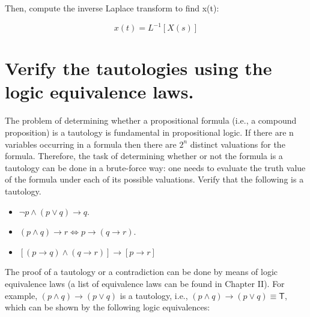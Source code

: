 \documentclass{article}
\begin{document}
Then, compute the inverse Laplace transform to find x(t):

\begin{equation*}
  x(t) = L^{-1}[ X(s) ]
\end{equation*}




\section{Verify the tautologies using the logic equivalence laws.}

The problem of determining whether a propositional formula (i.e., a compound proposition) is a tautology is fundamental in propositional logic. If there are n variables occurring in a formula then there are $2^n$ distinct valuations for the formula. Therefore, the task of determining whether or not the formula is a tautology can be done in a brute-force way: one needs to evaluate the truth value of the formula under each of its possible valuations. Verify that the following is a tautology.

\begin{itemize}
  \item $\lnot p \land (p \lor q) \to q$.
  \item $(p \land q) \to r \Leftrightarrow p \to (q \to r) $.
  \item $[(p \to q) \land (q \to r)] \to [p \to r]$
\end{itemize}

The proof of a tautology or a contradiction can be done by means of logic equivalence laws (a list of equivalence laws can be found in Chapter II). For example, $(p \land q) \to (p \lor q)$ is a tautology, i.e., $(p \land q) \to (p \lor q) \equiv \mathsf{T} $, which can be shown by the following logic equivalences:
\end{document}
